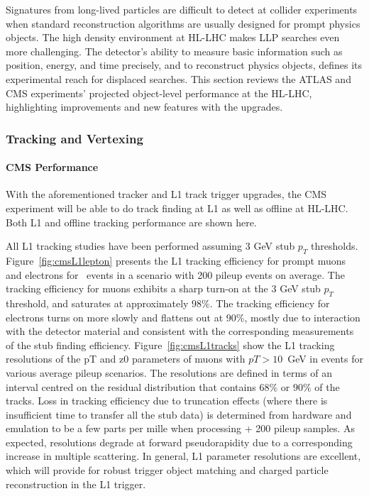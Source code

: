 Signatures from long-lived particles are difficult to detect at collider experiments when standard reconstruction algorithms are usually designed for prompt physics objects. The high density environment at HL-LHC makes LLP searches even more challenging. 
The detector's ability to measure basic information such as position, energy, and time precisely, and to reconstruct physics objects, defines its experimental reach for displaced searches.
This section reviews the ATLAS and CMS experiments' projected object-level performance at the HL-LHC, highlighting improvements and new features with the upgrades.

\subsubsection{Tracking and Vertexing} 

\paragraph{CMS Performance} 

With the aforementioned tracker and L1 track trigger upgrades, the CMS experiment will be able to do track finding at L1 as well as offline at HL-LHC. Both L1 and offline tracking performance are shown here. 

All L1 tracking studies have been performed assuming 3 GeV stub $p_T$ thresholds.
Figure~\ref{fig:cmsL1lepton} presents the L1 tracking efficiency for prompt muons and electrons for \ttbar~events in a scenario with 200 pileup events on average. 
The tracking efficiency for muons exhibits a sharp turn-on at the 3 GeV stub $p_T$ threshold, and saturates at approximately $98\%$. 
The tracking efficiency for electrons turns on more slowly and flattens out at $90\%$, mostly due to interaction with the detector material and consistent with the corresponding measurements of the stub finding efficiency. 
Figure~\ref{fig:cmsL1tracks} show the L1 tracking resolutions of the pT and z0 parameters of muons with $pT>10$~GeV in \ttbar events for various average pileup scenarios. The resolutions are defined in terms of an interval
centred on the residual distribution that contains $68\%$ or $90\%$ of the tracks.
Loss in tracking efficiency due to truncation effects (where there is insufficient time to transfer all the stub data) is determined from hardware and emulation to be a few parts per mille when processing \ttbar + 200 pileup samples.
As expected, resolutions degrade at forward pseudorapidity due to a corresponding increase in multiple scattering. 
In general, L1 parameter resolutions are excellent, which will provide for robust trigger object matching and charged particle reconstruction in the L1 trigger.

